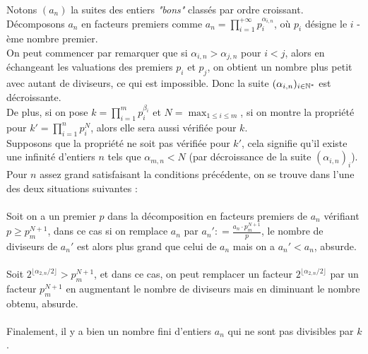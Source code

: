 \begin{sol}
Notons $(a_n)$ la suites des entiers \textit{"bons"} classés par ordre croissant. Décomposons $a_n$ en facteurs premiers comme $a_n = \prod \limits_{i = 1}^{ + \infty} p_i^{\alpha_{i, n}}$, où $p_i$ désigne le $i$ - ème nombre premier. \\
On peut commencer par remarquer que si $\alpha_{i, n}>\alpha_{j, n}$ pour $i<j$, alors en échangeant les valuations des premiers $p_i$ et $p_j$, on obtient un nombre plus petit avec autant de diviseurs, ce qui est impossible. Donc la suite $(\alpha_{i, n})_{i\in\mathbb N^*}$ est décroissante. \\
De plus, si on pose $k = \prod \limits_{i = 1}^mp_i^{\beta_i}$ et $N = \max_{1\le i\le m}$, si on montre la propriété pour $k' = \prod\limits_{i = 1}^{n}p_i^N$, alors elle sera aussi vérifiée pour $k$. \\

Supposons que la propriété ne soit pas vérifiée pour $k'$, cela signifie qu'il existe une infinité d'entiers $n$ tels que $\alpha_{m, n}<N$ (par décroissance de la suite $(\alpha_{i, n})_i$).\\
Pour $n$ assez grand satisfaisant la conditions précédente, on se trouve dans l'une des deux situations suivantes :\\\\
Soit on a un premier $p$ dans la décomposition en facteurs premiers de $a_n$ vérifiant $p\ge p_m^{N + 1}$, dans ce cas si on remplace $a_n$ par $a_n' : = \frac{a_n\cdot p_m^{N + 1}}{p}$, le nombre de diviseurs de $a_n'$ est alors plus grand que celui de $a_n$ mais on a $a_n'<a_n$, absurde. \\\\
Soit $2^{\lfloor\alpha_{2, n}/2\rfloor}>p_m^{N + 1}$, et dans ce cas, on peut remplacer un facteur $2^{\lfloor\alpha_{2, n}/2\rfloor}$ par un facteur $p_m^{N + 1}$ en augmentant le nombre de diviseurs mais en diminuant le nombre obtenu, absurde. \\\\
Finalement, il y a bien un nombre fini d'entiers $a_n$ qui ne sont pas divisibles par $k$.
\end{sol}


